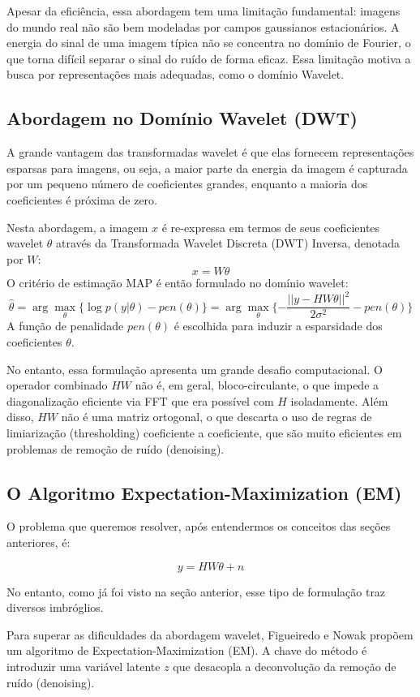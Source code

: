 \documentclass[12pt]{article}
\begin{document}
Apesar da eficiência, essa abordagem tem uma limitação fundamental: imagens do mundo real não são bem modeladas por campos gaussianos estacionários. A energia do sinal de uma imagem típica não se concentra no domínio de Fourier, o que torna difícil separar o sinal do ruído de forma eficaz. Essa limitação motiva a busca por representações mais adequadas, como o domínio Wavelet.


\subsection{Abordagem no Domínio Wavelet (DWT)}
A grande vantagem das transformadas wavelet é que elas fornecem representações esparsas para imagens, ou seja, a maior parte da energia da imagem é capturada por um pequeno número de coeficientes grandes, enquanto a maioria dos coeficientes é próxima de zero.

Nesta abordagem, a imagem $x$ é re-expressa em termos de seus coeficientes wavelet $\theta$ através da Transformada Wavelet Discreta (DWT) Inversa, denotada por $W$:
\[
x = W\theta
\]
O critério de estimação MAP é então formulado no domínio wavelet:
\[
\hat{\theta} = \arg \max_{\theta} \{ \log{p(y|\theta)} - pen(\theta) \} = \arg \max_{\theta} \{ -\frac{||y - HW\theta||^2}{2\sigma^2} - pen(\theta) \}
\]
A função de penalidade $pen(\theta)$ é escolhida para induzir a esparsidade dos coeficientes $\theta$.

No entanto, essa formulação apresenta um grande desafio computacional. O operador combinado $HW$ não é, em geral, bloco-circulante, o que impede a diagonalização eficiente via FFT que era possível com $H$ isoladamente. Além disso, $HW$ não é uma matriz ortogonal, o que descarta o uso de regras de limiarização (thresholding) coeficiente a coeficiente, que são muito eficientes em problemas de remoção de ruído (denoising).


\subsection{O Algoritmo Expectation-Maximization (EM)}
O problema que queremos resolver, após entendermos os conceitos das seções anteriores, é:

\[
y = HW\theta + n
\]

No entanto, como já foi visto na seção anterior, esse tipo de formulação traz diversos imbróglios.

Para superar as dificuldades da abordagem wavelet, Figueiredo e Nowak \cite{1217267} propõem um algoritmo de Expectation-Maximization (EM). A chave do método é introduzir uma variável latente $z$ que desacopla a deconvolução da remoção de ruído (denoising).
\end{document}
